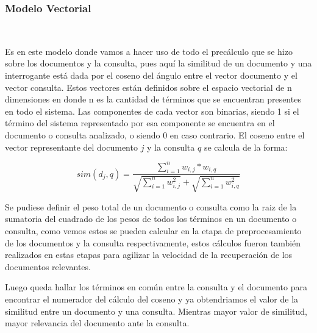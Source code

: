\documentclass{llncs}
\begin{document}
\subsubsection{Modelo Vectorial}\

Es en este modelo donde vamos a hacer uso de todo el precálculo que se hizo sobre los documentos y la consulta, pues aquí la similitud de un documento y una interrogante está dada por el coseno del ángulo entre el vector documento y el vector consulta. Estos vectores están definidos sobre el espacio vectorial de n dimensiones en donde n es la cantidad de términos que se encuentran presentes en todo el sistema. Las componentes de cada vector son binarias, siendo 1 si el término del sistema representado por esa componente se encuentra en el documento o consulta analizado, o siendo 0 en caso contrario. El coseno entre el vector representante del documento $j$ y la consulta $q$ se calcula de la forma:

\begin{equation}
    sim(d_j, q) = \frac{\sum_{i = 1}^n w_{i, j} * w_{i, q}}{\sqrt{\sum_{i = 1}^n w^2_{i, j}} + \sqrt{\sum_{i = 1}^n w^2_{i, q}}}
\end{equation}

Se pudiese definir el peso total de un documento o consulta como la raiz de la sumatoria del cuadrado de los pesos de todos los términos en un documento o consulta, como vemos estos se pueden calcular en la etapa de preprocesamiento de los documentos y la consulta respectivamente, estos cálculos fueron también realizados en estas etapas para agilizar la velocidad de la recuperación de los documentos relevantes.

Luego queda hallar los términos en común entre la consulta y el documento para encontrar el numerador del cálculo del coseno y ya obtendriamos el valor de la similitud entre un documento y una consulta. Mientras mayor valor de similitud, mayor relevancia del documento ante la consulta.
\end{document}
